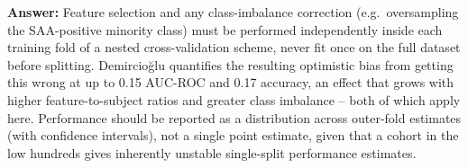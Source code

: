 \textbf{Answer:} Feature selection and any class-imbalance correction (e.g.\ oversampling the SAA-positive minority class) must be performed independently inside each training fold of a nested cross-validation scheme, never fit once on the full dataset before splitting. Demircio\u{g}lu \cite{demircioglu2021bias,demircioglu2024oversampling} quantifies the resulting optimistic bias from getting this wrong at up to 0.15 AUC-ROC and 0.17 accuracy, an effect that grows with higher feature-to-subject ratios and greater class imbalance -- both of which apply here. Performance should be reported as a distribution across outer-fold estimates (with confidence intervals), not a single point estimate, given that a cohort in the low hundreds gives inherently unstable single-split performance estimates.
